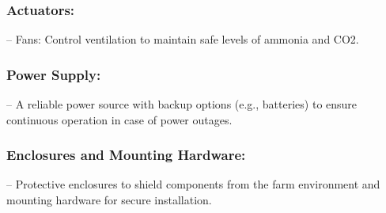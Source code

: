 \documentclass[../main.tex]{subfiles}
\begin{document}
\subsubsection{Actuators:}
 
– Fans: Control ventilation to maintain safe levels of ammonia and CO2.\\

                
\subsubsection{Power Supply:}
– A reliable power source with backup options (e.g., batteries) to ensure continuous
 operation in case of power outages.
                
\subsubsection{Enclosures and Mounting Hardware:}
 – Protective enclosures to shield components from the farm environment and
 mounting hardware for secure installation.
                
\end{document}
